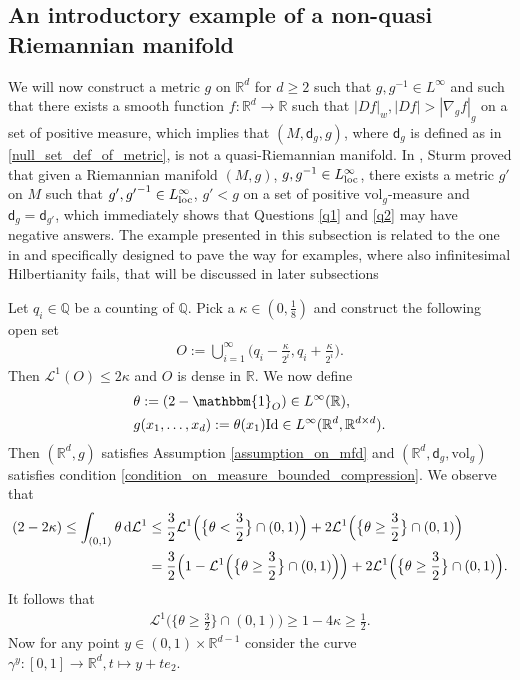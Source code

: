 \documentclass[a4paper,10pt]{article}
\numberwithin{equation}{section}
\newcommand{\R}{\mathbb{R}}
\newcommand{\Q}{\mathbb{Q}}
\newcommand{\vol}{\mathrm{vol}}
\newcommand{\sfd}{\mathsf d}
\newcommand{\di}{{\rm d}}
\begin{document}
\subsection{An introductory example of a non-quasi Riemannian manifold}\label{subsec:first_counter_quasi_riem}
We will now construct a metric $g$ on $\R^d$ for $d \geq 2$ such that $g, g^{-1} \in L^\infty$ and such that there exists a smooth function $f:\R^d \to \R$ such that $|Df|_w,|Df|> |\nabla_g f|_g$ on a set of positive measure, which implies that $(M, \sfd_g, g)$, where $\sfd_g$ is defined as in \eqref{null_set_def_of_metric}, is not a quasi-Riemannian manifold.
In \cite{sturm1997diffusion}, Sturm proved that given a Riemannian manifold $(M, g)$, $g, g^{-1} \in L^\infty_{\rm loc}$, there exists a metric $g'$ on $M$ such that $g', {g'}^{-1} \in L^\infty_{\rm loc}$, $g'<g$ on a set of positive $\vol_g$-measure and $\sfd_g= \sfd_{g'}$, which immediately shows that Questions \ref{q1} and \ref{q2} may have negative answers. The example presented in this subsection is related to the one in \cite{de1995lip} and specifically designed to pave the way for examples, where also infinitesimal Hilbertianity fails, that will be discussed in later subsections

Let $q_i \in \Q$ be a counting of $\Q$. Pick a $\kappa \in (0, \frac{1}{8})$ and construct the following open set 
\begin{align}\label{ex1_rational_cover}
    O:= \bigcup_{i=1}^\infty \Big(q_i-\frac{\kappa}{2^i}, q_i + \frac{\kappa}{2^i}\Big).
\end{align}
Then $\mathcal{L}^1(O) \leq 2\kappa$ and $O$ is dense in $\R$. We now define
\begin{align*}
    &\theta:= (2 -\mathbbm{1}_{O}) \in L^\infty(\R), \\
    &g(x_1, \ldots, x_d):= \theta(x_1)\mathrm{Id} \in L^\infty(\R^d, \R^{d\times d}).
\end{align*}
Then $(\R^d, g)$ satisfies Assumption \ref{assumption_on_mfd} and $(\R^d, \sfd_g, \vol_g)$ satisfies condition \eqref{condition_on_measure_bounded_compression}.
We observe that  
\begin{align*}
    (2-2\kappa) \leq \int_{(0,1)} \theta \, \di \mathcal{L}^1 &\leq \frac{3}{2} \mathcal{L}^1\Big(\big\{\theta < \frac{3}{2}\big\}\cap(0,1)\Big) + 2 \mathcal{L}^1\Big(\big\{\theta \geq \frac{3}{2}\big\}\cap (0,1)\Big) \\
    &=\frac{3}{2}\Big(1-\mathcal{L}^1\Big(\big\{\theta \geq \frac{3}{2}\big\}\cap (0,1)\Big)\Big)+ 2\mathcal{L}^1\Big(\big\{\theta \geq \frac{3}{2}\big\}\cap (0,1)\Big). 
\end{align*}
It follows that
\begin{align}\label{big_values_of_g}
    \mathcal{L}^1\Big(\big\{\theta \geq \frac{3}{2}\big\}\cap (0,1)\Big) \geq 1-4\kappa \geq \frac{1}{2}.
\end{align}
Now for any point $y \in  (0,1) \times\R^{d-1}$ consider the curve $\gamma^y:[0,1]\to \R^d, t \mapsto y+te_2$. 
\end{document}
